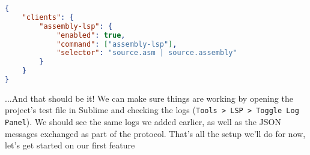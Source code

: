 \begin{lstlisting}[language=json]
{
    "clients": {
        "assembly-lsp": {
            "enabled": true,
            "command": ["assembly-lsp"],
            "selector": "source.asm | source.assembly"
        }
    }
}
\end{lstlisting}

...And that should be it! We can make sure things are working by opening the project's test file in Sublime and checking the logs (\texttt{Tools > LSP > Toggle Log Panel}).  We should see the same logs we added earlier, as well as the JSON messages exchanged as part of the protocol. That's all the setup we'll do for now, let's get started on our first feature %







